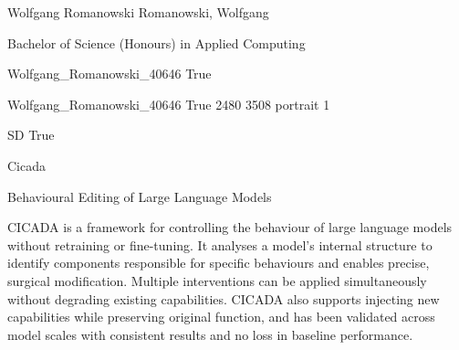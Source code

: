
\begingroup{}\relax



\def\Key{Wolfgang_Romanowski_40646}

{Wolfgang Romanowski}
{Romanowski, Wolfgang}

{Bachelor of Science (Honours) in Applied Computing}

{Wolfgang_Romanowski_40646}
{True}

{Wolfgang_Romanowski_40646}
{True}
{2480}
{3508}
{portrait}
{1}

{SD}
{True}

{Cicada}

{Behavioural Editing of Large Language Models}

{CICADA is a framework for controlling the behaviour of large language models without retraining or fine-tuning. It analyses a model's internal structure to identify components responsible for specific behaviours and enables precise, surgical modification. Multiple interventions can be applied simultaneously without degrading existing capabilities. CICADA also supports injecting new capabilities while preserving original function, and has been validated across model scales with consistent results and no loss in baseline performance.}

